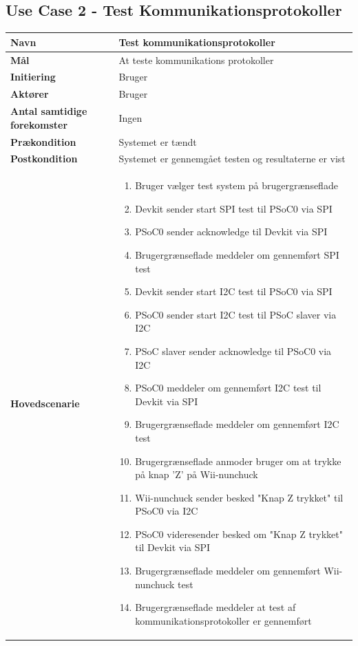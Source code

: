 \subsection{Use Case 2 - Test Kommunikationsprotokoller}
\begin{longtable}{|>{\hspace{0pt}}p{3cm}  |>{\hspace{0pt}}p{9cm}|}
	\hline
	\textbf{Navn} & Test kommunikationsprotokoller\\ \hline
	\textbf{Mål} & At teste kommunikations protokoller \\ \hline
	\textbf{Initiering} & Bruger\\ \hline
	\textbf{Aktører} & Bruger\\ \hline
	\textbf{Antal samtidige forekomster} & Ingen \\ \hline
	\textbf{Prækondition} & Systemet er tændt \\ \hline
	\textbf{Postkondition} &  Systemet er gennemgået testen og resultaterne er vist \\ \hline
	\textbf{Hovedscenarie} & \begin{enumerate}
		\item Bruger vælger test system på brugergrænseflade
		\item Devkit sender start SPI test til PSoC0 via SPI
		\item PSoC0 sender acknowledge til Devkit via SPI
		\subitem[Exception 1: PSoC0 sender ikke acknowledge]
		\item Brugergrænseflade meddeler om gennemført SPI test
		\item Devkit sender start I2C test til PSoC0 via SPI
		\item PSoC0 sender start I2C test til PSoC slaver via I2C
		\item PSoC slaver sender acknowledge til PSoC0 via I2C
		\subitem[Exception 2: PSoC slaver sender ikke acknowledge]
		\item PSoC0 meddeler om gennemført I2C test til Devkit via SPI
		\item Brugergrænseflade meddeler om gennemført I2C test
		\item Brugergrænseflade anmoder bruger om at trykke på knap 'Z' på Wii-nunchuck
		\item Wii-nunchuck sender besked "Knap Z trykket" til PSoC0 via I2C
		\subitem[Exception 3: Wii-nunchuck sender ikke "Knap Z trykket"]
		\item PSoC0 videresender besked om "Knap Z trykket" til Devkit via SPI
		\item Brugergrænseflade meddeler om gennemført Wii-nunchuck test
		\item Brugergrænseflade meddeler at test af kommunikationsprotokoller er gennemført 
		

\end{enumerate}
\end{longtable}
